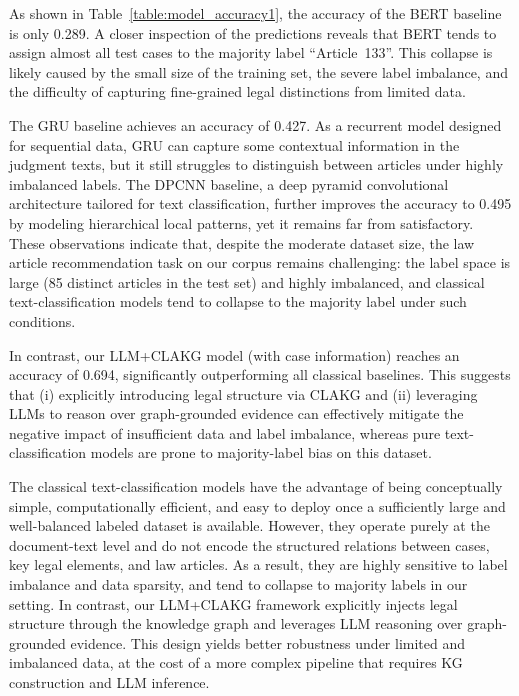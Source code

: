 \documentclass[review,times,nonatbib]{elsarticle} %
\renewcommand{\textcolor}[2]{#2}
\begin{document}
As shown in Table~\ref{table:model_accuracy1}, the accuracy of the BERT baseline is only 0.289. A closer inspection of the predictions reveals that BERT tends to assign almost all test cases to the majority label ``Article~133''. This collapse is likely caused by the small size of the training set, the severe label imbalance, and the difficulty of capturing fine-grained legal distinctions from limited data.

The GRU baseline achieves an accuracy of 0.427. As a recurrent model designed for sequential data, GRU can capture some contextual information in the judgment texts, but it still struggles to distinguish between articles under highly imbalanced labels. The DPCNN baseline, a deep pyramid convolutional architecture tailored for text classification, further improves the accuracy to 0.495 by modeling hierarchical local patterns, yet it remains far from satisfactory. These observations indicate that, despite the moderate dataset size, the law article recommendation task on our corpus remains challenging: the label space is large (85 distinct articles in the test set) and highly imbalanced, and classical text-classification models tend to collapse to the majority label under such conditions.

In contrast, our LLM+CLAKG model (with case information) reaches an accuracy of 0.694, significantly outperforming all classical baselines. This suggests that (i) explicitly introducing legal structure via CLAKG and (ii) leveraging LLMs to reason over graph-grounded evidence can effectively mitigate the negative impact of insufficient data and label imbalance, whereas pure text-classification models are prone to majority-label bias on this dataset.

\textcolor{blue}{The classical text-classification models have the advantage of being conceptually simple, computationally efficient, and easy to deploy once a sufficiently large and well-balanced labeled dataset is available. However, they operate purely at the document-text level and do not encode the structured relations between cases, key legal elements, and law articles. As a result, they are highly sensitive to label imbalance and data sparsity, and tend to collapse to majority labels in our setting. In contrast, our LLM+CLAKG framework explicitly injects legal structure through the knowledge graph and leverages LLM reasoning over graph-grounded evidence. This design yields better robustness under limited and imbalanced data, at the cost of a more complex pipeline that requires KG construction and LLM inference.}
\end{document}
